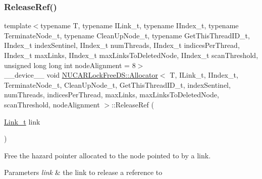 \subsubsection{\texorpdfstring{Release\+Ref()}{ReleaseRef()}}
{\footnotesize\ttfamily template$<$typename T, typename I\+Link\+\_\+t, typename I\+Index\+\_\+t, typename Terminate\+Node\+\_\+t, typename Clean\+Up\+Node\+\_\+t, typename Get\+This\+Thread\+I\+D\+\_\+t, I\+Index\+\_\+t index\+Sentinel, I\+Index\+\_\+t num\+Threads, I\+Index\+\_\+t indices\+Per\+Thread, I\+Index\+\_\+t max\+Links, I\+Index\+\_\+t max\+Links\+To\+Deleted\+Node, I\+Index\+\_\+t scan\+Threshold, unsigned long long int node\+Alignment = 8$>$ \\
\+\_\+\+\_\+device\+\_\+\+\_\+ void \mbox{\hyperlink{class_n_u_c_a_r_lock_free_d_s_1_1_allocator}{N\+U\+C\+A\+R\+Lock\+Free\+D\+S\+::\+Allocator}}$<$ T, I\+Link\+\_\+t, I\+Index\+\_\+t, Terminate\+Node\+\_\+t, Clean\+Up\+Node\+\_\+t, Get\+This\+Thread\+I\+D\+\_\+t, index\+Sentinel, num\+Threads, indices\+Per\+Thread, max\+Links, max\+Links\+To\+Deleted\+Node, scan\+Threshold, node\+Alignment $>$\+::Release\+Ref (\begin{DoxyParamCaption}\item[{\mbox{\hyperlink{class_n_u_c_a_r_lock_free_d_s_1_1_allocator_a5508d82b795e6c1977bebb67b5e5b686}{Link\+\_\+t}}}]{link }\end{DoxyParamCaption})\hspace{0.3cm}{\ttfamily [inline]}}

Free the hazard pointer allocated to the node pointed to by a link. 
\begin{DoxyParams}{Parameters}
{\em link} & the link to release a reference to \\
\hline
\end{DoxyParams}
\mbox{\label{class_n_u_c_a_r_lock_free_d_s_1_1_allocator_ab5813e074d787aa0fc50f1b02061a973}} 
